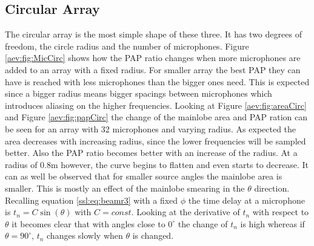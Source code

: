 \subsection{Circular Array}
The circular array is the most simple shape of these three.
It has two degrees of freedom, the circle radius and the number of microphones.
Figure \ref*{aev:fig:MicCirc} shows how the PAP ratio changes when
more microphones are added to an array with a fixed radius.
For smaller array the best PAP they can have is reached with less
microphones than the bigger ones need.
This is expected since a bigger radius means bigger spacings between microphones
which introduces aliasing on the higher frequencies.
Looking at Figure \ref*{aev:fig:areaCirc} and Figure \ref*{aev:fig:papCirc}
the change of the mainlobe area and PAP ration can be seen for
an array with 32 microphones and varying radius.
As expected the area decreases with increasing radius, since the lower frequencies will be
sampled better.
Also the PAP ratio becomes better with an increase of the radius.
At a radius of 0.8m however, the curve begins to flatten and even starts to decrease.
It can as well be observed that for smaller source angles the mainlobe area is smaller.
This is mostly an effect of the mainlobe smearing in the $\theta$ direction.
Recalling equation \eqref{ssl:eq:beamr3} with a fixed $\phi$
the time delay at a microphone is $t_n = C \sin(\theta)$ with $C=const$.
Looking at the derivative of $t_n$ with respect to $\theta$ it becomes
clear that with angles close to $0^\circ$ the change of $t_n$ is high
whereas if $\theta = 90^\circ$, $t_n$ changes slowly when $\theta$ is 
changed.


